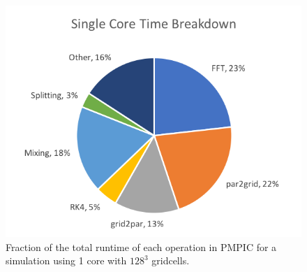 \documentclass{article}
\begin{document}
\begin{figure}
  \begin{center}
    \includegraphics{pmpic_images/pie.png}
  \end{center}
  \caption{Fraction of the total runtime of each operation in PMPIC for a simulation using 1 core with $128^3$ gridcells.}
  \label{pie chart}
\end{figure}
\end{document}
